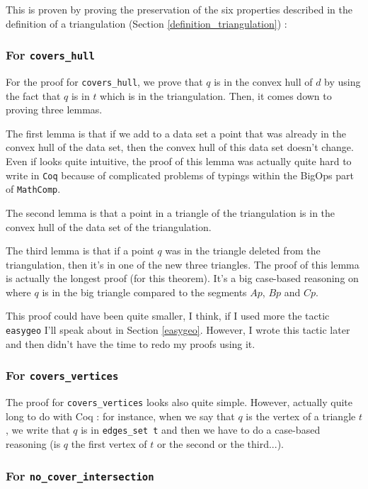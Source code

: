 \documentclass[a4paper,10pt]{article}
\begin{document}
This is proven by proving the preservation of the six properties described in the definition of a triangulation (Section \ref{definition_triangulation}) :
\subsubsection{For {\tt covers\_hull}}
\label{cvh1}
 For the proof for {\tt covers\_hull}, we prove that $q$ is in the convex hull of $d$ by using the fact that $q$ is in $t$ which is in the triangulation. Then, it comes down to proving three lemmas.

  The first lemma is that if we add to a data set a point that was already in the convex hull of the data set, then the convex hull of this data set doesn't change. Even if looks quite intuitive, the proof of this lemma was actually quite hard to write in {\tt Coq} because of complicated problems of typings within the BigOps part of {\tt MathComp}. 
  
  The second lemma is that a point in a triangle of the triangulation is in the convex hull of the data set of the triangulation.

  The third lemma is that if a point $q$ was in the triangle deleted from the triangulation, then it's in one of the new three triangles. The proof of this lemma is actually the longest proof (for this theorem).
  It's a big case-based reasoning on where $q$ is in the big triangle compared to the segments $Ap$, $Bp$ and $Cp$.
  
  This proof could have been quite smaller, I think, if I used more the tactic {\tt easygeo} I'll speak about in Section \ref{easygeo}. However, I wrote this tactic later and then didn't have the time to redo my proofs using it.

  \subsubsection{For {\tt covers\_vertices}}
  \label{cvv1}
  
  The proof for {\tt covers\_vertices} looks also quite simple. However, actually quite long to do with Coq : for instance, when we say that $q$ is the vertex of a triangle $t$, we write that $q$ is in {\tt edges\_set t} and then we have to do a case-based reasoning (is $q$ the first vertex of $t$ or the second or the third...).

  \subsubsection{For {\tt no\_cover\_intersection}}
\end{document}
